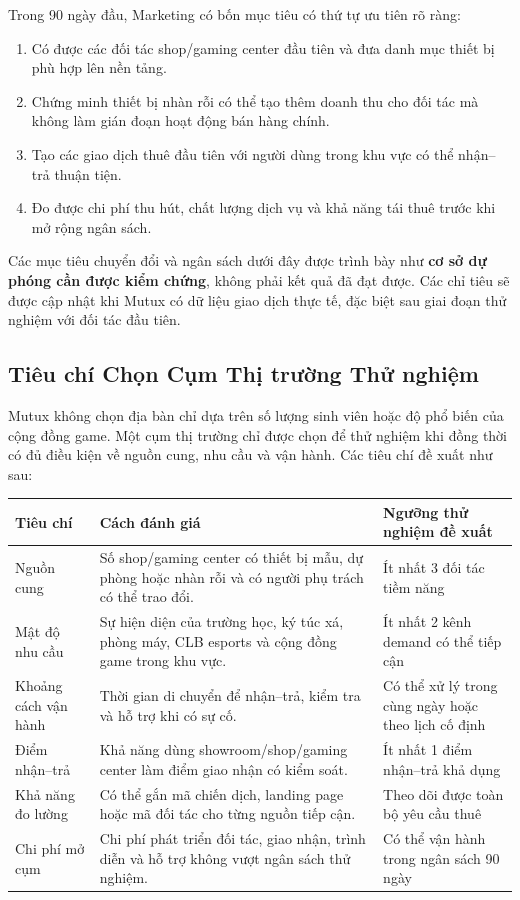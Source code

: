 Trong 90 ngày đầu, Marketing có bốn mục tiêu có thứ tự ưu tiên rõ ràng:
\begin{enumerate}
    \item Có được các đối tác shop/gaming center đầu tiên và đưa danh mục thiết bị phù hợp lên nền tảng.
    \item Chứng minh thiết bị nhàn rỗi có thể tạo thêm doanh thu cho đối tác mà không làm gián đoạn hoạt động bán hàng chính.
    \item Tạo các giao dịch thuê đầu tiên với người dùng trong khu vực có thể nhận--trả thuận tiện.
    \item Đo được chi phí thu hút, chất lượng dịch vụ và khả năng tái thuê trước khi mở rộng ngân sách.
\end{enumerate}

Các mục tiêu chuyển đổi và ngân sách dưới đây được trình bày như \textbf{cơ sở dự phóng cần được kiểm chứng}, không phải kết quả đã đạt được. Các chỉ tiêu sẽ được cập nhật khi Mutux có dữ liệu giao dịch thực tế, đặc biệt sau giai đoạn thử nghiệm với đối tác đầu tiên.

\subsection{Tiêu chí Chọn Cụm Thị trường Thử nghiệm}

Mutux không chọn địa bàn chỉ dựa trên số lượng sinh viên hoặc độ phổ biến của cộng đồng game. Một cụm thị trường chỉ được chọn để thử nghiệm khi đồng thời có đủ điều kiện về nguồn cung, nhu cầu và vận hành. Các tiêu chí đề xuất như sau:

\begin{longtable}{@{}p{}p{}p{}@{}}
\toprule
\textbf{Tiêu chí} & \textbf{Cách đánh giá} & \textbf{Ngưỡng thử nghiệm đề xuất} \\
\midrule
\endhead
Nguồn cung & Số shop/gaming center có thiết bị mẫu, dự phòng hoặc nhàn rỗi và có người phụ trách có thể trao đổi. & Ít nhất 3 đối tác tiềm năng \\
Mật độ nhu cầu & Sự hiện diện của trường học, ký túc xá, phòng máy, CLB esports và cộng đồng game trong khu vực. & Ít nhất 2 kênh demand có thể tiếp cận \\
Khoảng cách vận hành & Thời gian di chuyển để nhận--trả, kiểm tra và hỗ trợ khi có sự cố. & Có thể xử lý trong cùng ngày hoặc theo lịch cố định \\
Điểm nhận--trả & Khả năng dùng showroom/shop/gaming center làm điểm giao nhận có kiểm soát. & Ít nhất 1 điểm nhận--trả khả dụng \\
Khả năng đo lường & Có thể gắn mã chiến dịch, landing page hoặc mã đối tác cho từng nguồn tiếp cận. & Theo dõi được toàn bộ yêu cầu thuê \\
Chi phí mở cụm & Chi phí phát triển đối tác, giao nhận, trình diễn và hỗ trợ không vượt ngân sách thử nghiệm. & Có thể vận hành trong ngân sách 90 ngày \\
\bottomrule
\end{longtable}

